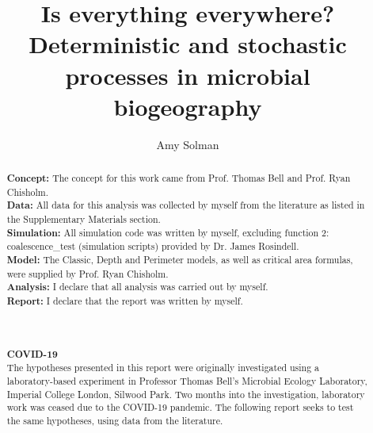 \documentclass[11pt, a4paper, twoside]{report}
\title{Is everything everywhere? Deterministic and stochastic processes in microbial biogeography}
\author{Amy Solman}
\begin{document}


\renewcommand{\abstractname}{Declaration}
\begin{abstract}
\textbf{Concept:} The concept for this work came from Prof. Thomas Bell and Prof. Ryan Chisholm.\\
\noindent \textbf{Data:} All data for this analysis was collected by myself from the literature as listed in the Supplementary Materials section.\\
\noindent \textbf{Simulation:} All simulation code was written by myself, excluding function 2: coalescence\_test (simulation scripts) provided by Dr. James Rosindell.\\
\noindent \textbf{Model:} The Classic, Depth and Perimeter models, as well as critical area formulas, were supplied by Prof. Ryan Chisholm.\\
\noindent \textbf{Analysis:} I declare that all analysis was carried out by myself.\\
\noindent \textbf{Report:} I declare that the report was written by myself.\\
\\ \\ \\

\noindent \textbf{COVID-19} \\
\noindent The hypotheses presented in this report were originally investigated using a laboratory-based experiment in Professor Thomas Bell's Microbial Ecology Laboratory, Imperial College London, Silwood Park. Two months into the investigation, laboratory work was ceased due to the COVID-19 pandemic. The following report seeks to test the same hypotheses, using data from the literature.
\end{abstract}
\end{document}
